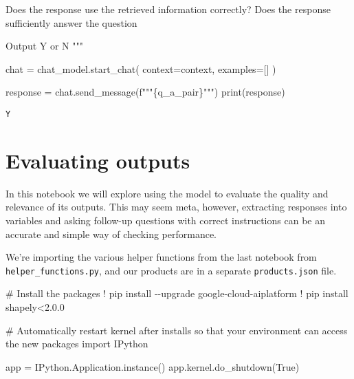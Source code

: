 \documentclass[
  letterpaper,
  DIV=11,
  numbers=noendperiod]{scrreprt}
\newenvironment{Shaded}{\begin{snugshade}}{\end{snugshade}}
\newcommand{\BuiltInTok}[1]{\textcolor[rgb]{0.00,0.23,0.31}{#1}}
\newcommand{\CommentTok}[1]{\textcolor[rgb]{0.37,0.37,0.37}{#1}}
\newcommand{\FloatTok}[1]{\textcolor[rgb]{0.68,0.00,0.00}{#1}}
\newcommand{\ImportTok}[1]{\textcolor[rgb]{0.00,0.46,0.62}{#1}}
\newcommand{\NormalTok}[1]{\textcolor[rgb]{0.00,0.23,0.31}{#1}}
\newcommand{\OperatorTok}[1]{\textcolor[rgb]{0.37,0.37,0.37}{#1}}
\newcommand{\SpecialCharTok}[1]{\textcolor[rgb]{0.37,0.37,0.37}{#1}}
\newcommand{\SpecialStringTok}[1]{\textcolor[rgb]{0.13,0.47,0.30}{#1}}
\newcommand{\VariableTok}[1]{\textcolor[rgb]{0.07,0.07,0.07}{#1}}
\begin{document}
\begin{Shaded}
\begin{Highlighting}[]
\SpecialStringTok{Does the response use the retrieved information correctly?}
\SpecialStringTok{Does the response sufficiently answer the question}

\SpecialStringTok{Output Y or N}
\SpecialStringTok{"""}

\NormalTok{chat }\OperatorTok{=}\NormalTok{ chat\_model.start\_chat(}
\NormalTok{    context}\OperatorTok{=}\NormalTok{context,}
\NormalTok{    examples}\OperatorTok{=}\NormalTok{[]}
\NormalTok{)}

\NormalTok{response }\OperatorTok{=}\NormalTok{ chat.send\_message(}\SpecialStringTok{f"""}\SpecialCharTok{\{}\NormalTok{q\_a\_pair}\SpecialCharTok{\}}\SpecialStringTok{"""}\NormalTok{)}
\BuiltInTok{print}\NormalTok{(response)}
\end{Highlighting}
\end{Shaded}

\begin{verbatim}
Y
\end{verbatim}

\hypertarget{evaluating-outputs}{%
\chapter{Evaluating outputs}\label{evaluating-outputs}}

In this notebook we will explore using the model to evaluate the quality
and relevance of its outputs. This may seem meta, however, extracting
responses into variables and asking follow-up questions with correct
instructions can be an accurate and simple way of checking performance.

We're importing the various helper functions from the last notebook from
\texttt{helper\_functions.py}, and our products are in a separate
\texttt{products.json} file.

\begin{Shaded}
\begin{Highlighting}[]
\CommentTok{\# Install the packages}
\OperatorTok{!}\NormalTok{ pip install }\OperatorTok{{-}{-}}\NormalTok{upgrade google}\OperatorTok{{-}}\NormalTok{cloud}\OperatorTok{{-}}\NormalTok{aiplatform}
\OperatorTok{!}\NormalTok{ pip install shapely}\OperatorTok{\textless{}}\FloatTok{2.0.0}
\end{Highlighting}
\end{Shaded}

\begin{Shaded}
\begin{Highlighting}[]
\CommentTok{\# Automatically restart kernel after installs so that your environment can access the new packages}
\ImportTok{import}\NormalTok{ IPython}

\NormalTok{app }\OperatorTok{=}\NormalTok{ IPython.Application.instance()}
\NormalTok{app.kernel.do\_shutdown(}\VariableTok{True}\NormalTok{)}
\end{Highlighting}
\end{Shaded}
\end{document}
